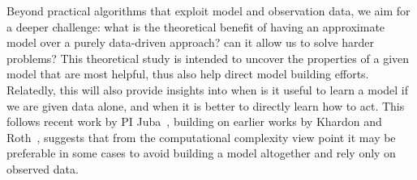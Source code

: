 Beyond practical algorithms that exploit model and observation data, we aim for a deeper challenge: what is the theoretical benefit of having an approximate model over a purely data-driven approach? can it allow us to solve harder problems? 
This theoretical study is intended to uncover the properties of a given model that are most helpful, thus also help direct model building efforts. Relatedly, this will also provide insights into when is it useful to learn a model if we are given data alone, and when it is better to directly learn how to act. 
This follows recent work by PI Juba~\cite{juba2013ijcai,juba2015itcs}, building on earlier works by Khardon and Roth~\cite{khardon1997l2r}, suggests that from the computational complexity view point it may be preferable in some cases to avoid building a model altogether and rely only on observed data.  %


